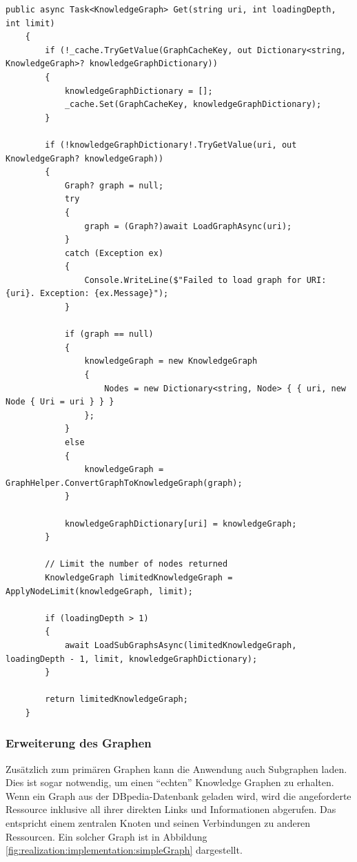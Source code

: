 \begin{lstlisting}[caption={Get-Methode des SparqlRepository zum Abrufen des Graphen mit Cache.}, label={list:realization:implementation:getMethod}]
    public async Task<KnowledgeGraph> Get(string uri, int loadingDepth, int limit)
    {
        if (!_cache.TryGetValue(GraphCacheKey, out Dictionary<string, KnowledgeGraph>? knowledgeGraphDictionary))
        {
            knowledgeGraphDictionary = [];
            _cache.Set(GraphCacheKey, knowledgeGraphDictionary);
        }

        if (!knowledgeGraphDictionary!.TryGetValue(uri, out KnowledgeGraph? knowledgeGraph))
        {
            Graph? graph = null;
            try
            {
                graph = (Graph?)await LoadGraphAsync(uri);
            }
            catch (Exception ex)
            {
                Console.WriteLine($"Failed to load graph for URI: {uri}. Exception: {ex.Message}");
            }

            if (graph == null)
            {
                knowledgeGraph = new KnowledgeGraph
                {
                    Nodes = new Dictionary<string, Node> { { uri, new Node { Uri = uri } } }
                };
            }
            else
            {
                knowledgeGraph = GraphHelper.ConvertGraphToKnowledgeGraph(graph);
            }

            knowledgeGraphDictionary[uri] = knowledgeGraph;
        }

        // Limit the number of nodes returned
        KnowledgeGraph limitedKnowledgeGraph = ApplyNodeLimit(knowledgeGraph, limit);

        if (loadingDepth > 1)
        {
            await LoadSubGraphsAsync(limitedKnowledgeGraph, loadingDepth - 1, limit, knowledgeGraphDictionary);
        }

        return limitedKnowledgeGraph;
    }
\end{lstlisting}

\subsubsection{Erweiterung des Graphen}

Zusätzlich zum primären Graphen kann die Anwendung auch Subgraphen laden. Dies ist sogar notwendig, um einen \enquote{echten} Knowledge Graphen zu erhalten. Wenn ein Graph aus der DBpedia-Datenbank geladen wird, wird die angeforderte Ressource inklusive all ihrer direkten Links und Informationen abgerufen. Das entspricht einem zentralen Knoten und seinen Verbindungen zu anderen Ressourcen. Ein solcher Graph ist in Abbildung \ref{fig:realization:implementation:simpleGraph} dargestellt.

